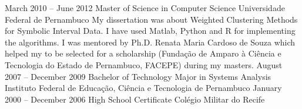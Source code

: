 \cvmetaevent
{March 2010 – June 2012}
{Master of Science in Computer Science}
{Universidade Federal de Pernambuco}
{My dissertation was about Weighted Clustering Methods for Symbolic Interval Data. I have used Matlab, Python and R for implementing the algorithms. I was mentored by Ph.D. Renata Maria Cardoso de Souza which helped my to be selected for a scholarship (Fundação de Amparo à Ciência e Tecnologia do Estado de Pernambuco, FACEPE) during my masters.}
\cvmetaevent
{August 2007 – December 2009}
{Bachelor of Technology Major in Systems Analysis}
{Instituto Federal de Educação, Ciência e Tecnologia de Pernambuco}
{}
\cvmetaevent
{January 2000 – December 2006}
{High School Certificate}
{Colégio Militar do Recife}
{}
